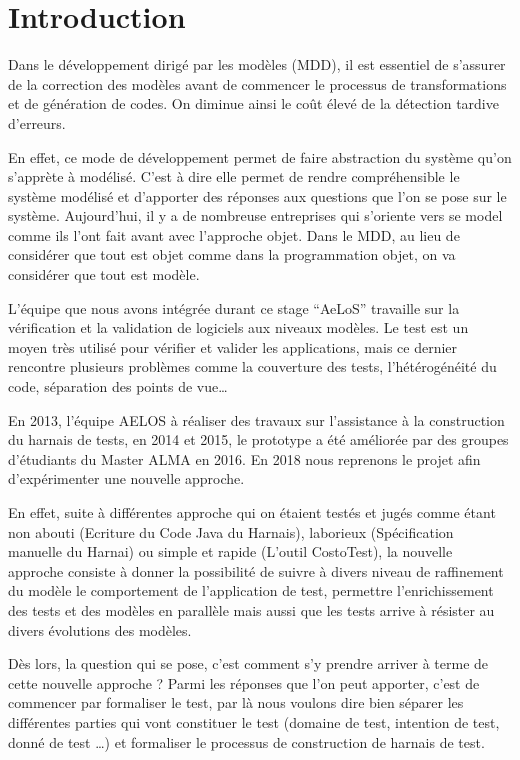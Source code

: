 \documentclass[
10pt, %
a4paper, %
oneside, %
headinclude,footinclude, %
BCOR5mm, %
]{report}
\begin{document}
  \newpage
	\section{Introduction}
	Dans le développement dirigé par les modèles (MDD), il est essentiel de s’assurer de la correction des modèles avant de commencer le processus de transformations et de génération de codes. On diminue ainsi le coût élevé de la détection tardive d’erreurs. 

	En effet, ce mode de développement permet de faire abstraction du système qu'on s'apprète à modélisé. C'est à dire elle permet de rendre compréhensible le système modélisé et d’apporter des réponses aux questions que l'on se pose sur le système. Aujourd'hui, il y a de nombreuse entreprises qui s'oriente vers se model comme ils l'ont fait avant avec l'approche objet. Dans le MDD, au lieu de considérer que tout est objet comme dans la programmation objet, on va considérer que tout est modèle.

	L’équipe que nous avons intégrée durant ce stage “AeLoS” travaille sur la vérification et la validation de logiciels aux niveaux modèles.	    
	Le test est un moyen très utilisé pour vérifier et valider les applications, mais ce dernier rencontre plusieurs problèmes comme la couverture des tests, l’hétérogénéité du code, séparation des points de vue…	   

	En 2013, l'équipe AELOS à réaliser des travaux sur l'assistance à la construction du harnais de tests, en 2014 et 2015, le prototype a été améliorée par des groupes d'étudiants du Master ALMA en 2016. En 2018 nous reprenons le projet afin d'expérimenter une nouvelle approche.

	En effet, suite à différentes approche qui on étaient testés et jugés comme étant non abouti (Ecriture du Code Java du Harnais), laborieux (Spécification manuelle du Harnai) ou simple et rapide (L'outil CostoTest), la nouvelle approche consiste à donner la possibilité de suivre à divers niveau de raffinement du modèle le comportement de l'application de test, permettre l'enrichissement des tests et des modèles en parallèle mais aussi que les tests arrive à résister au divers évolutions des modèles. 

	Dès lors, la question qui se pose, c'est comment s'y prendre arriver à terme de cette nouvelle approche ? Parmi les réponses que l'on peut apporter, c'est de commencer par formaliser le test, par là nous voulons dire bien séparer les différentes parties qui vont constituer le test (domaine de test, intention de test, donné de test …) et formaliser le processus de construction de harnais de test.
\end{document}

